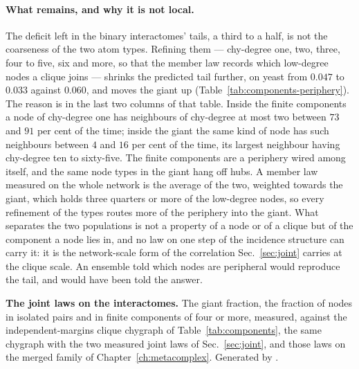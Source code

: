 \paragraph{What remains, and why it is not local.} The deficit left in the
binary interactomes' tails, a third to a half, is not the coarseness of
the two atom types. Refining them --- chy-degree one, two, three, four to
five, six and more, so that the member law records which low-degree nodes
a clique joins --- shrinks the predicted tail further, on yeast from
$0.047$ to $0.033$ against $0.060$, and moves the giant up
(Table~\ref{tab:components-periphery}). The reason is in the last two
columns of that table. Inside the finite components a node of chy-degree
one has neighbours of chy-degree at most two between $73$ and $91$ per
cent of the time; inside the giant the same kind of node has such
neighbours between $4$ and $16$ per cent of the time, its largest
neighbour having chy-degree ten to sixty-five. The finite components are a
periphery wired among itself, and the same node types in the giant hang
off hubs. A member law measured on the whole network is the average of
the two, weighted towards the giant, which holds three quarters or more
of the low-degree nodes, so every refinement of the types routes more of
the periphery into the giant. What separates the two populations is not a
property of a node or of a clique but of the component a node lies in,
and no law on one step of the incidence structure can carry it: it is the
network-scale form of the correlation Sec.~\ref{sec:joint} carries at the
clique scale. An ensemble told which nodes are peripheral would reproduce
the tail, and would have been told the answer.

\begin{table}[tb]
\centering
\begin{adjustbox}{width=\linewidth}

\end{adjustbox}
\caption{\textbf{The joint laws on the interactomes.} The giant fraction,
the fraction of nodes in isolated pairs and in finite components of four
or more, measured, against the independent-margins clique chygraph of
Table~\ref{tab:components}, the same chygraph with the two measured joint
laws of Sec.~\ref{sec:joint}, and those laws on the merged family of
Chapter~\ref{ch:metacomplex}. Generated by
.}
\label{tab:components-joint}
\end{table}

